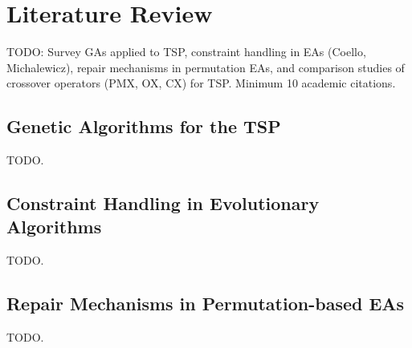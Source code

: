 \chapter{Literature Review}
\label{Chapter2}

TODO: Survey GAs applied to TSP, constraint handling in EAs (Coello, Michalewicz), repair mechanisms in permutation EAs, and comparison studies of crossover operators (PMX, OX, CX) for TSP. Minimum 10 academic citations.

\section{Genetic Algorithms for the TSP}
\label{Sec:GAForTSP}
TODO.

\section{Constraint Handling in Evolutionary Algorithms}
\label{Sec:ConstraintHandling}
TODO.

\section{Repair Mechanisms in Permutation-based EAs}
\label{Sec:RepairLiterature}
TODO.
